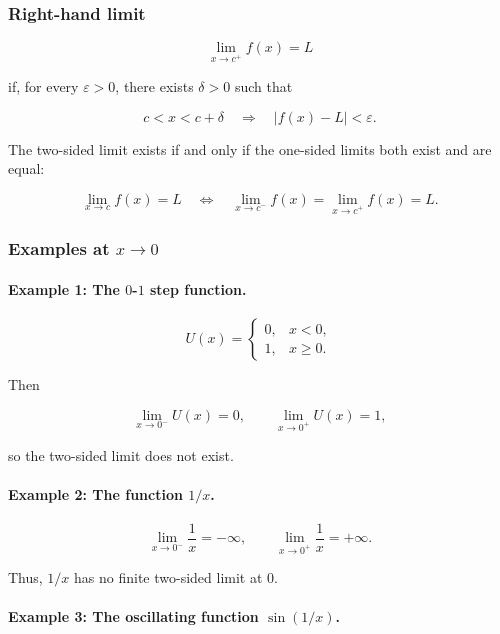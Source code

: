 \documentclass[11pt,a4paper]{article}
\begin{document}
\subsubsection{Right-hand limit}\label{right-hand-limit}

\[
\lim_{x\to c^+}f(x)=L
\]

if, for every \(\varepsilon>0\), there exists \(\delta>0\) such that

\[
c<x<c+\delta
\quad\Longrightarrow\quad
|f(x)-L|<\varepsilon.
\]

The two-sided limit exists if and only if the one-sided limits both
exist and are equal:

\[
\lim_{x\to c}f(x)=L
\quad\Longleftrightarrow\quad
\lim_{x\to c^-}f(x)=\lim_{x\to c^+}f(x)=L.
\]

\subsubsection{\texorpdfstring{Examples at
\(x\to0\)}{Examples at x\textbackslash to0}}\label{examples-at-xto0}

\paragraph{\texorpdfstring{Example 1: The \(0\)-\(1\) step
function.}{Example 1: The 0-1 step function.}}\label{example-1-the-0-1-step-function.}

\[
U(x)=
\begin{cases}
0, & x<0,\\
1, & x\geq0.
\end{cases}
\]

Then

\[
\lim_{x\to0^-}U(x)=0,
\qquad
\lim_{x\to0^+}U(x)=1,
\]

so the two-sided limit does not exist.

\paragraph{\texorpdfstring{Example 2: The function
\(1/x\).}{Example 2: The function 1/x.}}\label{example-2-the-function-1x.}

\[
\lim_{x\to0^-}\frac{1}{x}=-\infty,
\qquad
\lim_{x\to0^+}\frac{1}{x}=+\infty.
\]

Thus, \(1/x\) has no finite two-sided limit at \(0\).

\paragraph{\texorpdfstring{Example 3: The oscillating function
\(\sin(1/x)\).}{Example 3: The oscillating function \textbackslash sin(1/x).}}\label{example-3-the-oscillating-function-sin1x.}
\end{document}

